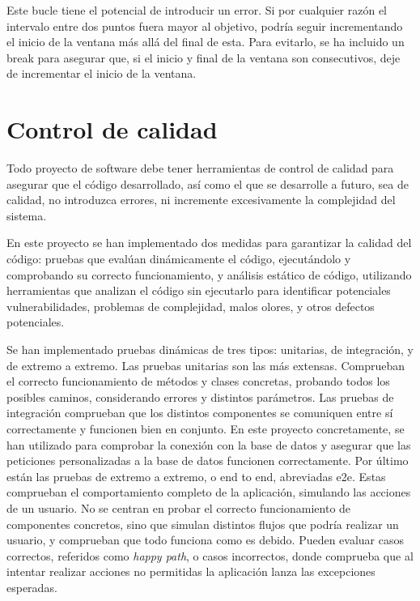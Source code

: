 Este bucle tiene el potencial de introducir un error. Si por cualquier razón el intervalo entre dos puntos fuera mayor al objetivo, podría seguir incrementando el inicio de la ventana más allá del final de esta. Para evitarlo, se ha incluido un break para asegurar que, si el inicio y final de la ventana son consecutivos, deje de incrementar el inicio de la ventana.

\section{Control de calidad} 
Todo proyecto de software debe tener herramientas de control de calidad para asegurar que el código desarrollado, así como el que se desarrolle a futuro, sea de calidad, no introduzca errores, ni incremente excesivamente la complejidad del sistema.

En este proyecto se han implementado dos medidas para garantizar la calidad del código: pruebas que evalúan dinámicamente el código, ejecutándolo y comprobando su correcto funcionamiento, y análisis estático de código, utilizando herramientas que analizan el código sin ejecutarlo para identificar potenciales vulnerabilidades, problemas de complejidad, malos olores, y otros defectos potenciales.

Se han implementado pruebas dinámicas de tres tipos: unitarias, de integración, y de extremo a extremo. Las pruebas unitarias son las más extensas. Comprueban el correcto funcionamiento de métodos y clases concretas, probando todos los posibles caminos, considerando errores y distintos parámetros. Las pruebas de integración comprueban que los distintos componentes se comuniquen entre sí correctamente y funcionen bien en conjunto. En este proyecto concretamente, se han utilizado para comprobar la conexión con la base de datos y asegurar que las peticiones personalizadas a la base de datos funcionen correctamente. Por último están las pruebas de extremo a extremo, o end to end, abreviadas e2e. Estas comprueban el comportamiento completo de la aplicación, simulando las acciones de un usuario. No se centran en probar el correcto funcionamiento de componentes concretos, sino que simulan distintos flujos que podría realizar un usuario, y comprueban que todo funciona como es debido. Pueden evaluar casos correctos, referidos como \textit{happy path}, o casos incorrectos, donde comprueba que al intentar realizar acciones no permitidas la aplicación lanza las excepciones esperadas. 

